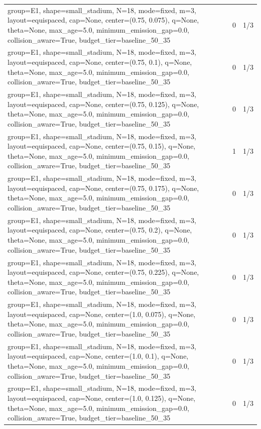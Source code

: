 \begin{tabular}{p{11cm}rr}
group=E1, shape=small\_stadium, N=18, mode=fixed, m=3, layout=equispaced, cap=None, center=(0.75, 0.075), q=None, theta=None, max\_age=5.0, minimum\_emission\_gap=0.0, collision\_aware=True, budget\_tier=baseline\_50\_35 & 0 & 1/3 \\
group=E1, shape=small\_stadium, N=18, mode=fixed, m=3, layout=equispaced, cap=None, center=(0.75, 0.1), q=None, theta=None, max\_age=5.0, minimum\_emission\_gap=0.0, collision\_aware=True, budget\_tier=baseline\_50\_35 & 0 & 1/3 \\
group=E1, shape=small\_stadium, N=18, mode=fixed, m=3, layout=equispaced, cap=None, center=(0.75, 0.125), q=None, theta=None, max\_age=5.0, minimum\_emission\_gap=0.0, collision\_aware=True, budget\_tier=baseline\_50\_35 & 0 & 1/3 \\
group=E1, shape=small\_stadium, N=18, mode=fixed, m=3, layout=equispaced, cap=None, center=(0.75, 0.15), q=None, theta=None, max\_age=5.0, minimum\_emission\_gap=0.0, collision\_aware=True, budget\_tier=baseline\_50\_35 & 1 & 1/3 \\
group=E1, shape=small\_stadium, N=18, mode=fixed, m=3, layout=equispaced, cap=None, center=(0.75, 0.175), q=None, theta=None, max\_age=5.0, minimum\_emission\_gap=0.0, collision\_aware=True, budget\_tier=baseline\_50\_35 & 0 & 1/3 \\
group=E1, shape=small\_stadium, N=18, mode=fixed, m=3, layout=equispaced, cap=None, center=(0.75, 0.2), q=None, theta=None, max\_age=5.0, minimum\_emission\_gap=0.0, collision\_aware=True, budget\_tier=baseline\_50\_35 & 0 & 1/3 \\
group=E1, shape=small\_stadium, N=18, mode=fixed, m=3, layout=equispaced, cap=None, center=(0.75, 0.225), q=None, theta=None, max\_age=5.0, minimum\_emission\_gap=0.0, collision\_aware=True, budget\_tier=baseline\_50\_35 & 0 & 1/3 \\
group=E1, shape=small\_stadium, N=18, mode=fixed, m=3, layout=equispaced, cap=None, center=(1.0, 0.075), q=None, theta=None, max\_age=5.0, minimum\_emission\_gap=0.0, collision\_aware=True, budget\_tier=baseline\_50\_35 & 0 & 1/3 \\
group=E1, shape=small\_stadium, N=18, mode=fixed, m=3, layout=equispaced, cap=None, center=(1.0, 0.1), q=None, theta=None, max\_age=5.0, minimum\_emission\_gap=0.0, collision\_aware=True, budget\_tier=baseline\_50\_35 & 0 & 1/3 \\
group=E1, shape=small\_stadium, N=18, mode=fixed, m=3, layout=equispaced, cap=None, center=(1.0, 0.125), q=None, theta=None, max\_age=5.0, minimum\_emission\_gap=0.0, collision\_aware=True, budget\_tier=baseline\_50\_35 & 0 & 1/3 \\

\end{tabular}

